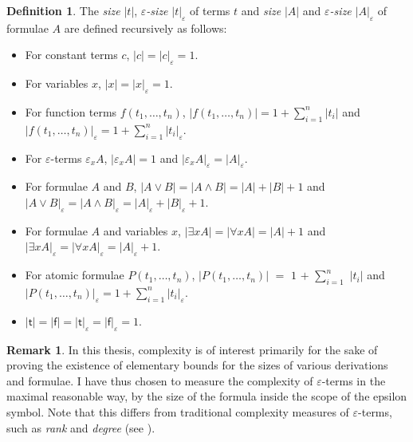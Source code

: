 \documentclass[10pt]{article}
\theoremstyle{definition}\newtheorem{remark}[theorem]{Remark}
\theoremstyle{definition}\newtheorem{example}[theorem]{Example}
\theoremstyle{definition}\newtheorem{definition}[theorem]{Definition}
\newcommand{\trueUnit}{\mathsf{t}}
\newcommand{\falseUnit}{\mathsf{f}}
\begin{document}
	\begin{definition}\label{FormulaSizeDefn}
		The \textit{size} $| t |$, \textit{$\varepsilon$-size} $| t |_\varepsilon$ of terms $t$ and \textit{size} $| A |$ and \textit{$\varepsilon$-size} $| A |_\varepsilon$ of formulae $A$ are defined recursively as follows:
		
		\begin{itemize}
			\item For constant terms $c$, $| c | = | c |_\varepsilon = 1$.
			
			\item For variables $x$, $| x | = | x |_\varepsilon = 1$.
			
			\item For function terms $f(t_1, \dots, t_n)$, $| f(t_1, \dots, t_n) | = 1 + \sum_{i = 1}^{n} | t_i |$ and $| f(t_1, \dots, t_n) |_\varepsilon = 1 + \sum_{i = 1}^{n} | t_i |_\varepsilon$.
			
			\item For $\varepsilon$-terms $\varepsilon_x A$, $| \varepsilon_x A | = 1$ and $| \varepsilon_x A |_\varepsilon = | A |_\varepsilon$.
			
			\item For formulae $A$ and $B$, $| A \lor B | = | A \land B | = | A | + | B | + 1$ and $| A \lor B |_\varepsilon = | A \land B |_\varepsilon = | A |_\varepsilon + | B |_\varepsilon + 1$.
			
			\item For formulae $A$ and variables $x$, $| \exists x A | = | \forall x A | = | A | + 1$ and $| \exists x A |_\varepsilon = | \forall x A |_\varepsilon = | A |_\varepsilon + 1$.
			
			\item For atomic formulae $P(t_1, \dots, t_n)$, $| P(t_1, \dots, t_n) |$ $=$ $1$ $+$ $\sum_{i = 1}^{n}$ $| t_i |$ and $| P(t_1, \dots, t_n) |_\varepsilon = 1 + \sum_{i = 1}^{n} | t_i |_\varepsilon$.
			
			\item $| \trueUnit | = | \falseUnit | = | \trueUnit |_\varepsilon = | \falseUnit |_\varepsilon = 1$.
		\end{itemize}
	\end{definition}
	
	\begin{remark}
		In this thesis, complexity is of interest primarily for the sake of proving the existence of elementary bounds for the sizes of various derivations and formulae. I have thus chosen to measure the complexity of $\varepsilon$-terms in the maximal reasonable way, by the size of the formula inside the scope of the epsilon symbol. Note that this differs from traditional complexity measures of $\varepsilon$-terms, such as \textit{rank} and \textit{degree} (see \cite{MoserZachEpsilonCalculusAndHerbrand}).
	\end{remark}
\end{document}

